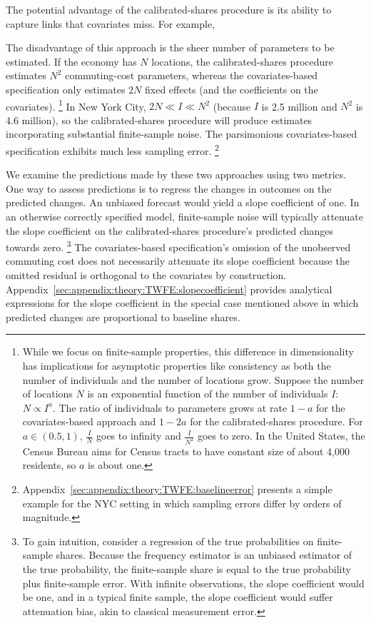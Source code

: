 \documentclass[11pt]{article}
\theoremstyle{definition}
\begin{document}
The potential advantage of the calibrated-shares procedure is its ability to capture links that covariates miss.
For example,


The disadvantage of this approach is the sheer number of parameters to be estimated.
If the economy has $N$ locations,
the calibrated-shares procedure estimates $N^2$ commuting-cost parameters,
whereas the covariates-based specification only estimates $2N$ fixed effects (and the coefficients on the covariates).%
\footnote{
	While we focus on finite-sample properties, this difference in dimensionality has implications for asymptotic properties like consistency as both the number of individuals and the number of locations grow.
	Suppose the number of locations $N$ is an exponential function of the number of individuals $I$: $N \propto I^{a}$.
	The ratio of individuals to parameters grows at rate $1-a$ for the covariates-based approach and $1-2a$ for the calibrated-shares procedure.
	For $a \in (0.5,1)$, $\frac{I}{N}$ goes to infinity and $\frac{I}{N^2}$ goes to zero.
	In the United States, the Census Bureau aims for Census tracts to have constant size of about 4,000 residents,
	so $a$ is about one.
}
In New York City,
$2N \ll I \ll N^2$ (because $I$ is 2.5 million and $N^2$ is 4.6 million),
so the calibrated-shares procedure will produce estimates incorporating substantial finite-sample noise.
The parsimonious covariates-based specification exhibits much less sampling error.%
\footnote{Appendix~\ref{sec:appendix:theory:TWFE:baselineerror} presents a simple example for the NYC setting in which sampling errors differ by orders of magnitude.}

We examine the predictions made by these two approaches using two metrics.
One way to assess predictions is to regress the changes in outcomes on the predicted changes.
An unbiased forecast would yield a slope coefficient of one.
In an otherwise correctly specified model,
finite-sample noise will typically attenuate the slope coefficient on the calibrated-shares procedure's predicted changes towards zero.%
\footnote{
	To gain intuition, consider a regression of the true probabilities on finite-sample shares.
	Because the frequency estimator is an unbiased estimator of the true probability,
	the finite-sample share is equal to the true probability plus finite-sample error.
	With infinite observations, the slope coefficient would be one,
	and 
	in a typical finite sample, the slope coefficient would suffer attenuation bias,
	akin to classical measurement error.
}
The covariates-based specification's omission of the unobserved commuting cost does not necessarily attenuate its slope coefficient
because the omitted residual is orthogonal to the covariates by construction.
Appendix~\ref{sec:appendix:theory:TWFE:slopecoefficient} provides analytical expressions for the slope coefficient in the special case mentioned above in which predicted changes are proportional to baseline shares.
\end{document}
